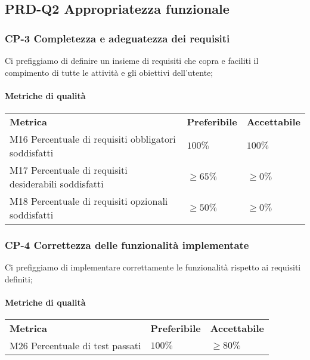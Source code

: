     \subsection{PRD-Q2 Appropriatezza funzionale}
        \subsubsection{CP-3 Completezza e adeguatezza dei requisiti}
        	Ci prefiggiamo di definire un insieme di requisiti che copra e faciliti il compimento di tutte le attività e gli obiettivi dell'utente;
        \paragraph{Metriche di qualità}
        \begin{longtable} {
        		>{}p{80mm} 
        		>{}p{25mm}
        		>{}p{25mm}
        	}
        	\rowcolor{gray!50}
        	\textbf{Metrica} & \textbf{Preferibile} & \textbf{Accettabile} \TBstrut \TBstrut \\
        	M16 Percentuale di requisiti obbligatori soddisfatti & $100\%$ & $100\%$ \TBstrut \\ [2mm]
        	M17 Percentuale di requisiti desiderabili soddisfatti & $\ge65\%$ & $\ge0\%$ \TBstrut \\ [2mm]
        	M18 Percentuale di requisiti opzionali soddisfatti & $\ge50\%$ & $\ge0\%$ \TBstrut \\ [2mm]
        \end{longtable}
    \subsubsection{CP-4 Correttezza delle funzionalità implementate}
    	Ci prefiggiamo di implementare correttamente le funzionalità rispetto ai requisiti definiti;
    	\paragraph{Metriche di qualità}
    	\begin{longtable} {
    			>{}p{80mm} 
    			>{}p{25mm}
    			>{}p{25mm}
    		}
    		\rowcolor{gray!50}
    		\textbf{Metrica} & \textbf{Preferibile} & \textbf{Accettabile} \TBstrut \TBstrut \\
    		M26 Percentuale di test passati & $100\%$ & $\ge 80\%$ \TBstrut \\ [2mm]
    	\end{longtable}
            
